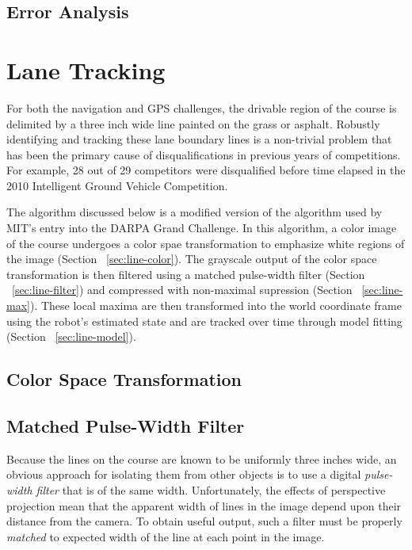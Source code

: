 \documentclass[11pt,twocolumn]{article}
\begin{document}
\subsection{Error Analysis}

\section{Lane Tracking}
\label{sec:lane}
For both the navigation and GPS challenges, the drivable region of the course
is delimited by a three inch wide line painted on the grass or asphalt.
Robustly identifying and tracking these lane boundary lines is a non-trivial
problem that has been the primary cause of disqualifications in previous years
of competitions. For example, 28 out of 29 competitors were disqualified before
time elapsed in the 2010 Intelligent Ground Vehicle Competition.

The algorithm discussed below is a modified version of the algorithm used by
MIT's entry into the DARPA Grand Challenge. In this algorithm, a color image
of the course undergoes a color spae transformation to emphasize white regions
of the image (Section ~\ref{sec:line-color}). The grayscale output of the color
space transformation is then filtered using a matched pulse-width filter
(Section ~\ref{sec:line-filter}) and compressed with non-maximal supression
(Section ~\ref{sec:line-max}). These local maxima are then transformed into
the world coordinate frame using the robot's estimated state and are tracked
over time through model fitting (Section ~\ref{sec:line-model}).

\subsection{Color Space Transformation}


\subsection{Matched Pulse-Width Filter}
Because the lines on the course are known to be uniformly three inches wide, an
obvious approach for isolating them from other objects is to use a digital
\textit{pulse-width filter} that is of the same width. Unfortunately, the
effects of perspective projection mean that the apparent width of lines in the
image depend upon their distance from the camera. To obtain useful output, such
a filter must be properly \textit{matched} to expected width of the line at
each point in the image.
\end{document}
